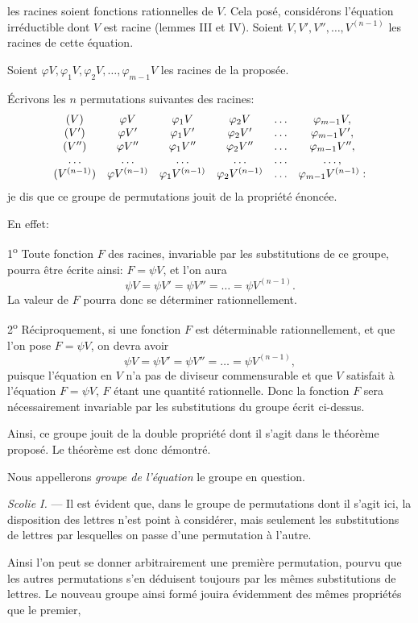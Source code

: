 
les racines soient fonctions rationnelles de $V$. Cela posé, considérons
l'équation irréductible dont $V$ est racine (lemmes III et IV).
Soient $V,V',V'',\ldots,V^{(n-1)}$ les racines de cette équation.

Soient $\varphi V,\varphi_{1}V,\varphi_{2}V,\ldots,\varphi_{m-1}V$ les racines de la proposée.

Écrivons les $n$ permutations suivantes des racines:
\[
\begin{array}{c@{\quad}ccccc}
(V)&\varphi V&\varphi_{1}V&\varphi_{2}V&\ldots&\varphi_{m-1}V,\\
(V')&\varphi V'&\varphi_{1}V'&\varphi_{2}V'&\ldots&\varphi_{m-1}V',\\
(V'')&\varphi V''&\varphi_{1}V''&\varphi_{2}V''&\ldots&\varphi_{m-1}V'',\\
\ldots&\ldots&\ldots&\ldots&\ldots&\ldots,\\
(V^{(n-1)})&\varphi V^{(n-1)}&\varphi_{1}V^{(n-1)}&\varphi_{2}V^{(n-1)}&\ldots&\varphi_{m-1}V^{(n-1)}:
\end{array}
\]
je dis que ce groupe de permutations jouit de la propriété énoncée.

En effet:

1\textsuperscript{o} Toute fonction $F$ des racines, invariable par les substitutions
de ce groupe, pourra être écrite ainsi: $F=\psi V$, et l'on aura
\[
\psi V=\psi V'=\psi V''=\ldots=\psi V^{(n-1)}.
\]
La valeur de $F$ pourra donc se déterminer rationnellement.

2\textsuperscript{o} Réciproquement, si une fonction $F$ est déterminable rationnellement,
et que l'on pose $F=\psi V$, on devra avoir
\[
\psi V=\psi V'=\psi V''=\ldots=\psi V^{(n-1)},
\]
puisque l'équation en $V$ n'a pas de diviseur commensurable et que
$V$ satisfait à l'équation $F=\psi V$, $F$ étant une quantité rationnelle.
Donc la fonction $F$ sera nécessairement invariable par les substitutions
du groupe écrit ci-dessus.

Ainsi, ce groupe jouit de la double propriété dont il s'agit dans
le théorème proposé. Le théorème est donc démontré.

Nous appellerons \emph{groupe de l'équation} le groupe en question.

\emph{Scolie I.} --- Il est évident que, dans le groupe de permutations
dont il s'agit ici, la disposition des lettres n'est point à considérer,
mais seulement les substitutions de lettres par lesquelles on passe
d'une permutation à l'autre.

Ainsi l'on peut se donner arbitrairement une première permutation,
pourvu que les autres permutations s'en déduisent toujours
par les mêmes substitutions de lettres. Le nouveau groupe ainsi
formé jouira évidemment des mêmes propriétés que le premier,
